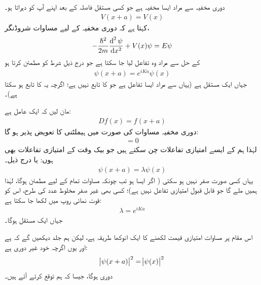 دوری مخفیہ سے مراد ایسا مخفیہ ہے جو کسی مستقل فاصلہ  کے بعد اپنے آپ کو دہراتا ہو۔ 
\begin{align}\label{مساوات_متماثل_دوری_مخفیہ_کنگھی}
	V(x+a) = V(x)
\end{align}
 کہتا ہے کہ دوری مخفیہ کے لیے مساوات شروڈنگر،
\begin{align}
	-\frac{\hslash^{2}}{2m}\frac{\dif^{\,2}\psi}{\dif x^{2}} +V(x)\psi = E\psi
\end{align}
کے حل سے مراد وہ تفاعل لیا جا سکتا ہے جو درج ذیل شرط کو مطمئن کرتا ہو
\begin{align}\label{مساوات_متماثل_اگلا}
	\psi(x+a) = e^{iKa}\psi(x)
\end{align}
جہاں  ایک مستقل ہے (یہاں  سے مراد ایسا تفاعل ہے جو  کا تابع نہیں ہے؛ اگرچہ یہ  کا تابع ہو سکتا ہے)۔

 مان لیں کہ  ایک عامل ہے:
\begin{align}
	Df(x) = f(x+a)
\end{align}
دوری مخفیہ مساوات  کی صورت میں  ہیملٹنی کا  تعویض پذیر  ہو گا:
\begin{align}
	[D, H] = 0
\end{align}
لہٰذا ہم  کے ایسے امتیازی تفاعلات چن سکتے ہیں جو بیک وقت  کے امتیازی تفاعلات بھی ہوں: یا درج ذیل۔
\begin{align}\label{مساوات_متماثل_دوری_تفاعل_الف}
	\psi(x+a) = \lambda\psi(x)
\end{align}
یہاں  کسی صورت صفر نہیں ہو سکتی ( اگر ایسا ہو تب چونکہ مساوات  تمام  کے لیے مطمئن ہوگا، لہٰذا ہمیں  ملے گا جو قابل قبول امتیازی تفاعل نہیں ہے)؛ کسی بھی غیر صفر مخلوط عدد کی طرح، اس کو قوت نمائی روپ میں لکھا جا سکتا ہے: 
\begin{align}\label{مساوت_متماثل_قوت_نما_مستقل}
	\lambda = e^{iKa}
\end{align}
جہاں  ایک مستقل ہوگا۔

اس مقام پر مساوات  امتیازی قیمت  لکھنے کا ایک انوکھا طریقہ ہے، لیکن ہم جلد دیکھیں گے کہ  ہے اور یوں اگرچہ  خود غیر دوری ہے:
\begin{align}\label{مساوات_متماثل_آخری_مقام_تفاعل_ابتدائی}
	\abs{\psi(x+a)}^{2} = \abs{\psi(x)}^{2}
\end{align}
دوری ہوگا، جیسا کہ ہم توقع کرتے آئے ہیں۔


